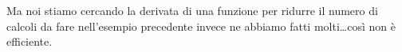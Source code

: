 \begin{esempio}
% 
\end{esempio}
Ma noi stiamo cercando la derivata di una funzione per ridurre il numero 
di calcoli da fare nell'esempio precedente invece ne abbiamo fatti 
molti\dots così non è efficiente.

